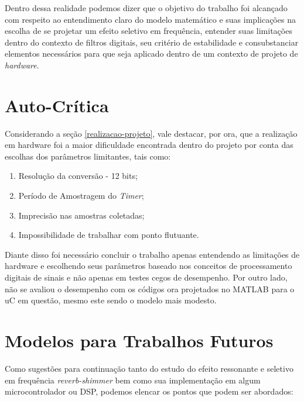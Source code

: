 		Dentro dessa realidade podemos dizer que o objetivo do trabalho foi alcançado com respeito ao entendimento claro do modelo matemático e suas implicações na escolha de se projetar um efeito seletivo em frequência, entender suas limitações dentro do contexto de filtros digitais, seu critério de estabilidade e consubstanciar elementos necessários para que seja aplicado dentro de um contexto de projeto de \textit{hardware}.
	
	\section{Auto-Crítica}
		Considerando a seção \ref{realizacao-projeto}, vale destacar, por ora, que a realização em hardware foi a maior dificuldade encontrada dentro do projeto por conta das escolhas dos parâmetros limitantes, tais como:
		
		\begin{enumerate}
			\item Resolução da conversão - 12 bits;
			\item Período de Amostragem do \textit{Timer};
			\item Imprecisão nas amostras coletadas;
			\item Impossibilidade de trabalhar com ponto flutuante.
		\end{enumerate}
		
		Diante disso foi necessário concluir o trabalho apenas entendendo as limitações de hardware e escolhendo seus parâmetros baseado nos conceitos de processamento digitais de sinais e não apenas em testes cegos de desempenho. Por outro lado, não se avaliou o desempenho com os códigos ora projetados no MATLAB para o uC em questão, mesmo este sendo o modelo mais modesto.
		
	\section{Modelos para Trabalhos Futuros}
		 
		 Como sugestões para continuação tanto do estudo do efeito ressonante e seletivo em frequência \textit{reverb-shimmer} bem como sua implementação em algum microcontrolador ou DSP, podemos elencar os pontos que podem ser abordados:
		 
